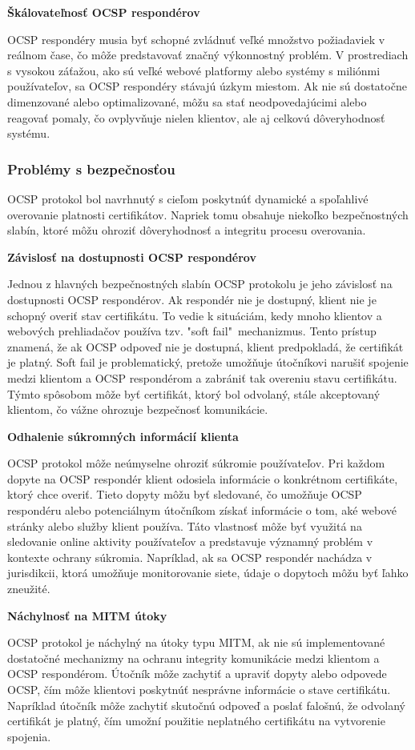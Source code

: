 \documentclass[12pt, twoside]{book}
\newcommand{\subsubsubsection}[1]{%
  \vspace{0.2em}  
  \textbf{#1} \\[0.2em]
  \hspace*{\parindent}
}
\begin{document}
\subsubsubsection{Škálovateľnosť OCSP respondérov}
OCSP respondéry musia byť schopné zvládnuť veľké množstvo požiadaviek v reálnom čase, čo môže predstavovať značný výkonnostný problém. V prostrediach s vysokou záťažou, ako sú veľké webové platformy alebo systémy s miliónmi používateľov, sa OCSP respondéry stávajú úzkym miestom. Ak nie sú dostatočne dimenzované alebo optimalizované, môžu sa stať neodpovedajúcimi alebo reagovať pomaly, čo ovplyvňuje nielen klientov, ale aj celkovú dôveryhodnosť systému.\cite{wazan, smith}

\subsubsection{Problémy s bezpečnosťou}
OCSP protokol bol navrhnutý s cieľom poskytnúť dynamické a spoľahlivé overovanie platnosti certifikátov. Napriek tomu obsahuje niekoľko bezpečnostných slabín, ktoré môžu ohroziť dôveryhodnosť a integritu procesu overovania.

\subsubsubsection{Závislosť na dostupnosti OCSP respondérov}
Jednou z hlavných bezpečnostných slabín OCSP protokolu je jeho závislosť na dostupnosti OCSP respondérov. Ak respondér nie je dostupný, klient nie je schopný overiť stav certifikátu. To vedie k situáciám, kedy mnoho klientov a webových prehliadačov používa tzv. "soft fail"\ mechanizmus. Tento prístup znamená, že ak OCSP odpoveď nie je dostupná, klient predpokladá, že certifikát je platný. Soft fail je problematický, pretože umožňuje útočníkovi narušiť spojenie medzi klientom a OCSP respondérom a zabrániť tak overeniu stavu certifikátu. Týmto spôsobom môže byť certifikát, ktorý bol odvolaný, stále akceptovaný klientom, čo vážne ohrozuje bezpečnosť komunikácie.\cite{security_pki}

\subsubsubsection{Odhalenie súkromných informácií klienta}
OCSP protokol môže neúmyselne ohroziť súkromie používateľov. Pri každom dopyte na OCSP respondér klient odosiela informácie o konkrétnom certifikáte, ktorý chce overiť. Tieto dopyty môžu byť sledované, čo umožňuje OCSP respondéru alebo potenciálnym útočníkom získať informácie o tom, aké webové stránky alebo služby klient používa. Táto vlastnosť môže byť využitá na sledovanie online aktivity používateľov a predstavuje významný problém v kontexte ochrany súkromia. Napríklad, ak sa OCSP respondér nachádza v jurisdikcii, ktorá umožňuje monitorovanie siete, údaje o dopytoch môžu byť ľahko zneužité.\cite{turin2}

\subsubsubsection{Náchylnosť na MITM útoky}
OCSP protokol je náchylný na útoky typu MITM, ak nie sú implementované dostatočné mechanizmy na ochranu integrity komunikácie medzi klientom a OCSP respondérom. Útočník môže zachytiť a upraviť dopyty alebo odpovede OCSP, čím môže klientovi poskytnúť nesprávne informácie o stave certifikátu. Napríklad útočník môže zachytiť skutočnú odpoveď a poslať falošnú, že odvolaný certifikát je platný, čím umožní použitie neplatného certifikátu na vytvorenie spojenia.\cite{wazan}
\end{document}
